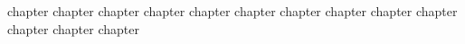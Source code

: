 \documentclass{claynote}
\begin{document}
\begin{void}
{

    \begin{pre}
    \end{pre}

    \begin{body}
        {chapter}
        {chapter}
        {chapter}
        {chapter}
        {chapter}
        {chapter}
        {chapter}
        {chapter}
        {chapter}
        {chapter}
        {chapter}
        {chapter}
        {chapter}
    \end{body}
}
\end{void}
\end{document}
